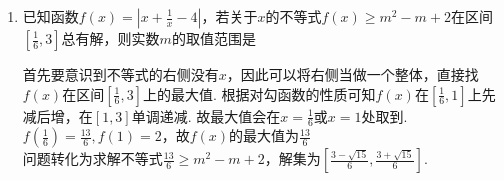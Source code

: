 \begin{enumerate}
\begin{enumerate}
\begin{jieda}
            \ps \textbf{区分有解问题和恒成立问题}.
        \end{jieda}
        \item 已知函数$f(x) = |x + \frac{1}{x} - 4|$，若关于$x$的不等式$f(x) \geq m^2-m+2$在区间$[\frac{1}{6}, 3]$总有解，则实数$m$的取值范围是
        \begin{jieda}
            首先要意识到不等式的右侧没有$x$，因此可以将右侧当做一个整体，直接找$f(x)$在区间$[\frac{1}{6}, 3]$上的最大值. 根据对勾函数的性质可知$f(x)$在$[\frac{1}{6}, 1]$上先减后增，在$[1, 3]$单调递减. 故最大值会在$x = \frac{1}{6}$或$x = 1$处取到.$f(\frac{1}{6}) = \frac{13}{6}, f(1) = 2$，故$f(x)$的最大值为$\frac{13}{6}$ \\
            问题转化为求解不等式$\frac{13}{6} \geq m^2-m+2$，解集为$[\frac{3-\sqrt{15}}{6}, \frac{3+\sqrt{15}}{6}]$. 
        \end{jieda}
        

\end{enumerate}
\end{enumerate}
